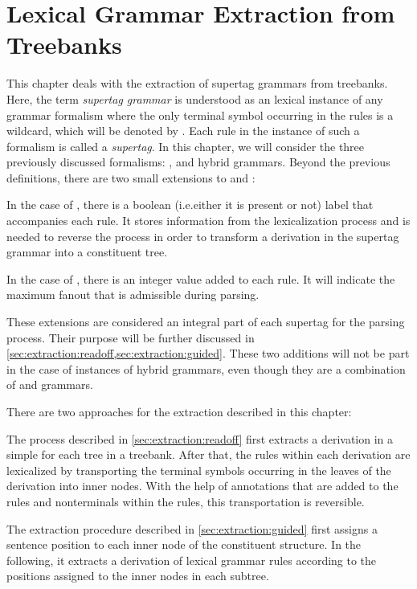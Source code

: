 \documentclass[../document.tex]{subfiles}
\begin{document}
    \chapter{Lexical Grammar Extraction from Treebanks}
    This chapter deals with the extraction of supertag grammars from treebanks.
    Here, the term \emph{supertag grammar} is understood as an lexical instance of any grammar formalism where the only terminal symbol occurring in the rules is a wildcard, which will be denoted by \tn{*}.
    Each rule in the instance of such a formalism is called a \emph{supertag}.
    In this chapter, we will consider the three previously discussed formalisms: ,  and hybrid grammars.
    Beyond the previous definitions, there are two small extensions to  and :
    \begin{compactenum}
        \item
            In the case of , there is a boolean (i.e.\@ either it is present or not) label that accompanies each rule.
            It stores information from the lexicalization process and is needed to reverse the process in order to transform a derivation in the supertag grammar into a constituent tree.
        \item
            In the case of , there is an integer value added to each rule.
            It will indicate the maximum fanout that is admissible during parsing.
    \end{compactenum}
    These extensions are considered an integral part of each supertag for the parsing process.
    Their purpose will be further discussed in \cref{sec:extraction:readoff,sec:extraction:guided}.
    These two additions will not be part in the case of instances of hybrid grammars, even though they are a combination of  and  grammars.

    There are two approaches for the extraction described in this chapter:
    \begin{compactenum}
        \item
            The process described in \cref{sec:extraction:readoff} first extracts a derivation in a simple  for each tree in a treebank.
            After that, the rules within each derivation are lexicalized by transporting the terminal symbols occurring in the leaves of the derivation into inner nodes.
            With the help of annotations that are added to the rules and nonterminals within the rules, this transportation is reversible.
        \item
            The extraction procedure described in \cref{sec:extraction:guided} first assigns a sentence position to each inner node of the constituent structure.
            In the following, it extracts a derivation of lexical grammar rules according to the positions assigned to the inner nodes in each subtree.
    \end{compactenum}
\end{document}
